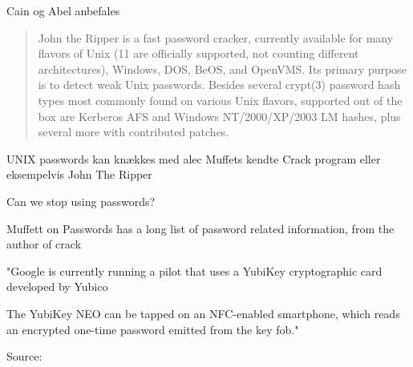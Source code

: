 \documentclass[20pt,landscape,a4paper,footrule]{foils}
\begin{document}


\begin{list1}
\item  Cain og Abel anbefales   
\end{list1}


\begin{quote}
John the Ripper is a fast password cracker, currently available for
many flavors of Unix (11 are officially supported, not counting
different architectures), Windows, DOS, BeOS, and OpenVMS. Its primary
purpose is to detect weak Unix passwords. Besides several crypt(3)
password hash types most commonly found on various Unix flavors,
supported out of the box are Kerberos AFS and Windows NT/2000/XP/2003
LM hashes, plus several more with contributed patches.   
\end{quote}

\begin{list1}
\item UNIX passwords kan knækkes med alec Muffets kendte Crack program
  eller eksempelvis John The Ripper   
\end{list1}





Can we stop using passwords?

Muffett on Passwords has a long list of password related information, from the author of crack 






"Google is currently running a pilot that uses a YubiKey cryptographic card developed by Yubico

The YubiKey NEO can be tapped on an NFC-enabled smartphone, which reads an encrypted one-time password emitted from the key fob."

{\footnotesize Source:
}
\end{document}
